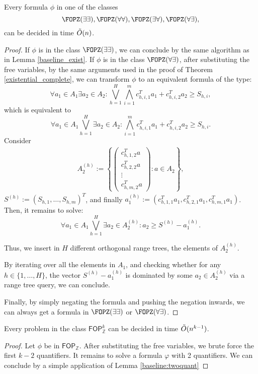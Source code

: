 \begin{lemma}
Every formula $\phi$ in one of the classes $$\FOPZ(\exists \exists),\FOPZ(\forall \forall),\FOPZ(\exists \forall ),\FOPZ(\forall \exists),$$
can be decided in time $\Tilde{O}(n)$.  \label{baseline:twoquant}
\end{lemma}
\begin{proof}
If $\phi$ is in the class $\FOPZ(\exists \exists)$, we can conclude by the same algorithm as in Lemma \ref{baseline_exist}.
If $\phi$ is in the class $\FOPZ(\forall \exists)$, after substituting the free variables, by the same arguments used in the proof of Theorem \ref{existential_complete}, we can transform $\phi$ to an equivalent formula of the type:
$$\forall a_1 \in A_1 \exists a_2 \in A_2:\bigvee_{h=1}^{H}\bigwedge_{i=1}^{m} c_{h,i,1}^T  a_1+ c_{h,i,2}^T a_2 \geq S_{h,i},$$
which is equivalent to 
$$\forall a_1 \in A_1 \bigvee_{h=1}^{H} \exists a_2 \in A_2:\bigwedge_{i=1}^{m} c_{h,i,1}^T  a_1+ c_{h,i,2}^T a_2 \geq S_{h,i}.$$
Consider 
\begin{align*}
  A_2^{(h)}:=\left\{ \left(\begin{array}{c}
  c_{h,1,2}^T a  \\
  c_{h,2,2}^T a \\
  \vdots  \\
  c_{h,m,2}^T a
  \end{array}\right)   : a \in A_2 \right\},
\end{align*}
$S^{(h)}:=(S_{h,1},\dots,S_{h,m})^T$, and finally $a_1^{(h)}:=(c_{h,1,1}^T a_1,c_{h,2,1}^T a_1, c_{h,m,1}^T a_1)$.
Then, it remains to solve:
$$\forall a_1 \in A_1 \bigvee_{h=1}^{H} \exists a_2 \in A_2^{(h)}: a_2 \geq S^{(h)} -a_1^{(h)}.$$

Thus, we insert in $H$ different orthogonal range trees, the elements of $A_2^{(h)}$.

By iterating over all the elements in $A_1$, and checking whether for any $h \in \{1,\dots,H\}$, the vector $S^{(h)}-a_1^{(h)}$ is dominated by some $a_2 \in A_2^{(h)}$ via a range tree query,
we can conclude. 

Finally, by simply negating the formula and pushing the negation inwards, we can always get a formula in $\FOPZ(\exists \exists)$ or $\FOPZ(\forall \exists)$.
\end{proof}
\begin{lemma}
  Every problem in the class $\mathsf{FOP}_{\mathbb{Z}}^k$ can be decided in time $\Tilde{O}(n^{k-1})$.
\label{baseline} 
\end{lemma}
  \begin{proof}
  Let $\phi$ be in $\mathsf{FOP}_{\mathbb{Z}}$.
  After substituting the free variables, we brute force the first $k-2$ quantifiers. It remains to solve a formula 
 $\varphi$ with 2 quantifiers. We can conclude by a simple application of Lemma \ref{baseline:twoquant}
\end{proof}


